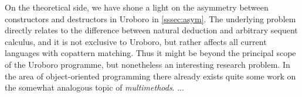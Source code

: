 On the theoretical side, we have shone a light on the asymmetry between constructors and destructors in Uroboro in \autoref{sssec:asym}. The underlying problem directly relates to the difference between natural deduction and arbitrary sequent calculus, and it is not exclusive to Uroboro, but rather affects all current languages with copattern matching. Thus it might be beyond the principal scope of the Uroboro programme, but nonetheless an interesting research problem. In the area of object-oriented programming there already exists quite some work on the somewhat analogous topic of \textit{multimethods}. ...